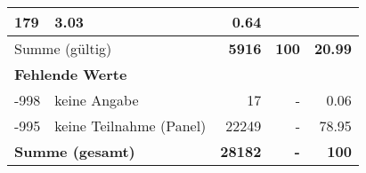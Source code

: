\begin{longtable}{lXrrr}
       \num{179} &
       \num[round-mode=places,round-precision=2]{3,03} &
         \num[round-mode=places,round-precision=2]{0,64} \\
     \midrule
     \multicolumn{2}{l}{Summe (gültig)} &
       \textbf{\num{5916}} &
     \textbf{100} &
       \textbf{\num[round-mode=places,round-precision=2]{20,99}} \\
     \multicolumn{5}{l}{\textbf{Fehlende Werte}}\\
       -998 &
       keine Angabe &
         \num{17} &
        - &
         \num[round-mode=places,round-precision=2]{0,06} \\
       -995 &
       keine Teilnahme (Panel) &
         \num{22249} &
        - &
         \num[round-mode=places,round-precision=2]{78,95} \\
     \midrule
     \multicolumn{2}{l}{\textbf{Summe (gesamt)}} &
          \textbf{\num{28182}} &
        \textbf{-} &
        \textbf{100} \\
     \bottomrule
     \end{longtable}
     
